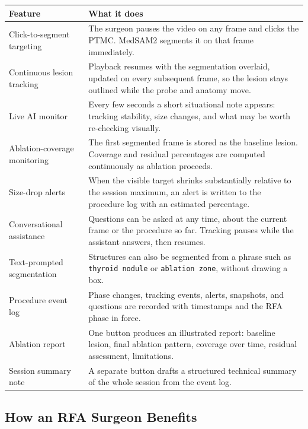 \documentclass[11pt,a4paper]{article}
\newcommand{\code}[1]{\texttt{\small #1}}
\begin{document}
\begin{longtable}{@{}p{4.6cm}p{10.4cm}@{}}
\toprule
\textbf{Feature} & \textbf{What it does} \\
\midrule
\endhead
Click-to-segment targeting &
The surgeon pauses the video on any frame and clicks the PTMC. MedSAM2
segments it on that frame immediately. \\
\addlinespace
Continuous lesion tracking &
Playback resumes with the segmentation overlaid, updated on every subsequent
frame, so the lesion stays outlined while the probe and anatomy move. \\
\addlinespace
Live AI monitor &
Every few seconds a short situational note appears: tracking stability, size
changes, and what may be worth re-checking visually. \\
\addlinespace
Ablation-coverage monitoring &
The first segmented frame is stored as the baseline lesion. Coverage and
residual percentages are computed continuously as ablation proceeds. \\
\addlinespace
Size-drop alerts &
When the visible target shrinks substantially relative to the session
maximum, an alert is written to the procedure log with an estimated
percentage. \\
\addlinespace
Conversational assistance &
Questions can be asked at any time, about the current frame or the procedure
so far. Tracking pauses while the assistant answers, then resumes. \\
\addlinespace
Text-prompted segmentation &
Structures can also be segmented from a phrase such as \code{thyroid nodule}
or \code{ablation zone}, without drawing a box. \\
\addlinespace
Procedure event log &
Phase changes, tracking events, alerts, snapshots, and questions are recorded
with timestamps and the RFA phase in force. \\
\addlinespace
Ablation report &
One button produces an illustrated report: baseline lesion, final ablation
pattern, coverage over time, residual assessment, limitations. \\
\addlinespace
Session summary note &
A separate button drafts a structured technical summary of the whole session
from the event log. \\
\bottomrule
\end{longtable}

\subsection{How an RFA Surgeon Benefits}
\end{document}
